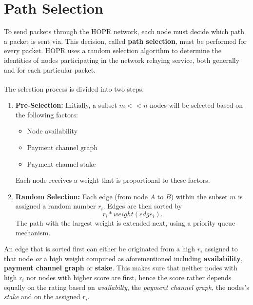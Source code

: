 \section{Path Selection}
\label{sec:pathselection}

To send packets through the HOPR network, each node must
decide which path a packet is sent via. This decision, called
\textbf{path selection}, must be performed for every packet. HOPR uses a
random selection algorithm to determine the identities of nodes participating in
the network relaying service, both generally and for each particular packet.
\\~\\The selection process is divided into two steps:

\begin{enumerate}

    \item \textbf{Pre-Selection:}
          Initially, a subset $m<<n$ nodes will be selected based on the following factors:
          \begin{itemize}
              \item Node availability
              \item Payment channel graph
              \item Payment channel stake
          \end{itemize}
          Each node receives a weight that is proportional to these factors.

    \item \textbf{Random Selection:} Each edge (from node $A$ to $B$) within the subset
          $m$ is assigned a random number $r_i$. Edges are then sorted by
          $$r_i*weight(edge_i).$$ The path with the largest weight is extended next,
          using a priority queue mechanism.

\end{enumerate}

An edge that is sorted first can either be originated from a high $r_i$ assigned to that node \textit{or} a high weight computed as aforementioned including \textbf{availability}, \textbf{payment channel graph} or \textbf{stake}. This makes sure that neither nodes with high $r_i$ nor nodes with higher score are first, hence the score rather depends equally on the rating based on \textit{availabilty}, the \textit{payment channel graph}, the nodes's \textit{stake} and on the assigned $r_i$.

